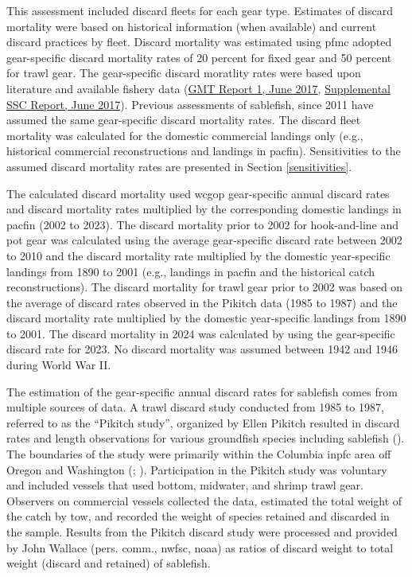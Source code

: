 \documentclass[
  english,
]{article}
\begin{document}
This assessment included discard fleets for each gear type. Estimates of
discard mortality were based on historical information (when available)
and current discard practices by fleet. Discard mortality was estimated
using \gls{pfmc} adopted gear-specific discard mortality rates of 20
percent for fixed gear and 50 percent for trawl gear. The gear-specific
discard moratlity rates were based upon literature and available fishery
data
(\href{https://www.pcouncil.org/documents/2017/06/f3a_gmt_rpt1_discardmortality_june2017bb.pdf/}{GMT
Report 1, June 2017},
\href{https://www.pcouncil.org/documents/2017/06/f3a_sup_ssc_rpt_discardcredits_june2017bb.pdf/}{Supplemental
SSC Report, June 2017}). Previous assessments of sablefish, since 2011
have assumed the same gear-specific discard mortality rates. The discard
fleet mortality was calculated for the domestic commercial landings only
(e.g., historical commercial reconstructions and landings in
\gls{pacfin}). Sensitivities to the assumed discard mortality rates are
presented in Section \ref{sensitivities}.

The calculated discard mortality used \gls{wcgop} gear-specific annual
discard rates and discard mortality rates multiplied by the
corresponding domestic landings in \gls{pacfin} (2002 to 2023). The
discard mortality prior to 2002 for hook-and-line and pot gear was
calculated using the average gear-specific discard rate between 2002 to
2010 and the discard mortality rate multiplied by the domestic
year-specific landings from 1890 to 2001 (e.g., landings in \gls{pacfin}
and the historical catch reconstructions). The discard mortality for
trawl gear prior to 2002 was based on the average of discard rates
observed in the Pikitch data (1985 to 1987) and the discard mortality
rate multiplied by the domestic year-specific landings from 1890 to
2001. The discard mortality in 2024 was calculated by using the
gear-specific discard rate for 2023. No discard mortality was assumed
between 1942 and 1946 during World War II.

The estimation of the gear-specific annual discard rates for sablefish
comes from multiple sources of data. A trawl discard study conducted
from 1985 to 1987, referred to as the ``Pikitch study'', organized by
Ellen Pikitch resulted in discard rates and length observations for
various groundfish species including sablefish
(). The
boundaries of the study were primarily within the Columbia \gls{inpfc}
area off Oregon and Washington
(;
).
Participation in the Pikitch study was voluntary and included vessels
that used bottom, midwater, and shrimp trawl gear. Observers on
commercial vessels collected the data, estimated the total weight of the
catch by tow, and recorded the weight of species retained and discarded
in the sample. Results from the Pikitch discard study were processed and
provided by John Wallace (pers. comm., \gls{nwfsc}, \gls{noaa}) as
ratios of discard weight to total weight (discard and retained) of
sablefish.
\end{document}
